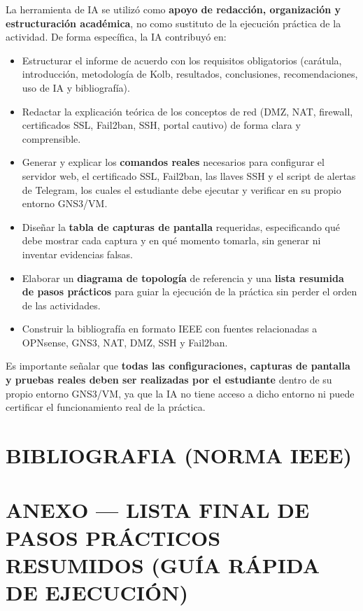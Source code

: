 \documentclass{article}
\providecommand{\tightlist}{%
  \setlength{\itemsep}{0pt}\setlength{\parskip}{0pt}}
\renewcommand{\_}{\oldunderscore\hskip0pt\relax}
\begin{document}
La herramienta de IA se utilizó como \textbf{apoyo de redacción,
organización y estructuración académica}, no como sustituto de la
ejecución práctica de la actividad. De forma específica, la IA
contribuyó en:

\begin{itemize}
\tightlist
\item
  Estructurar el informe de acuerdo con los requisitos obligatorios
  (carátula, introducción, metodología de Kolb, resultados,
  conclusiones, recomendaciones, uso de IA y bibliografía).
\item
  Redactar la explicación teórica de los conceptos de red (DMZ, NAT,
  firewall, certificados SSL, Fail2ban, SSH, portal cautivo) de forma
  clara y comprensible.
\item
  Generar y explicar los \textbf{comandos reales} necesarios para
  configurar el servidor web, el certificado SSL, Fail2ban, las llaves
  SSH y el script de alertas de Telegram, los cuales el estudiante debe
  ejecutar y verificar en su propio entorno GNS3/VM.
\item
  Diseñar la \textbf{tabla de capturas de pantalla} requeridas,
  especificando qué debe mostrar cada captura y en qué momento tomarla,
  sin generar ni inventar evidencias falsas.
\item
  Elaborar un \textbf{diagrama de topología} de referencia y una
  \textbf{lista resumida de pasos prácticos} para guiar la ejecución de
  la práctica sin perder el orden de las actividades.
\item
  Construir la bibliografía en formato IEEE con fuentes relacionadas a
  OPNsense, GNS3, NAT, DMZ, SSH y Fail2ban.
\end{itemize}

Es importante señalar que \textbf{todas las configuraciones, capturas de
pantalla y pruebas reales deben ser realizadas por el estudiante} dentro
de su propio entorno GNS3/VM, ya que la IA no tiene acceso a dicho
entorno ni puede certificar el funcionamiento real de la práctica.

\hypertarget{bibliografuxeda-norma-ieee}{%
\section{BIBLIOGRAFIA (NORMA IEEE)}\label{bibliografuxeda-norma-ieee}}

\nocite{*}
\vspace{-1em}
\renewcommand{\refname}{}


\hypertarget{anexo-lista-final-de-pasos-pruxe1cticos-resumidos-guuxeda-ruxe1pida-de-ejecuciuxf3n}{%
\section{ANEXO --- LISTA FINAL DE PASOS PRÁCTICOS RESUMIDOS (GUÍA RÁPIDA
DE
EJECUCIÓN)}\label{anexo-lista-final-de-pasos-pruxe1cticos-resumidos-guuxeda-ruxe1pida-de-ejecuciuxf3n}}
\end{document}
